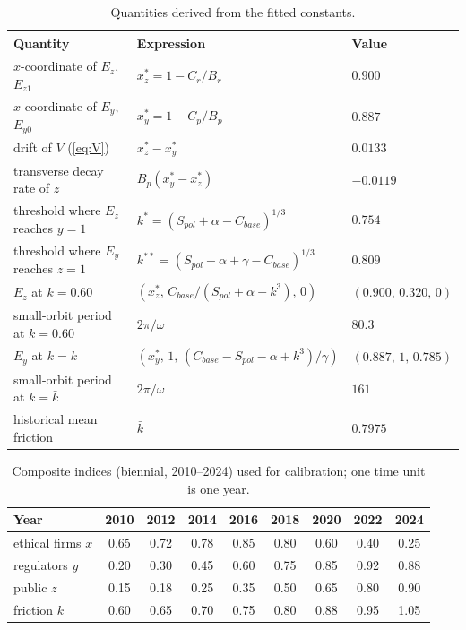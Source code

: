 \documentclass[10pt]{article}
\newcommand{\kbar}{\bar{k}}
\begin{document}
\begin{appendices}
\begin{table}
\centering
\caption{Quantities derived from the fitted constants.}\label{tab:derived}
{\small
\begin{tabular}{@{}lll@{}}
\toprule
Quantity & Expression & Value \\
\midrule
$x$-coordinate of $E_z$, $E_{z1}$ & $x_z^*=1-C_r/B_r$ & $0.900$ \\
$x$-coordinate of $E_y$, $E_{y0}$ & $x_y^*=1-C_p/B_p$ & $0.887$ \\
drift of $V$ (\cref{eq:V}) & $x_z^*-x_y^*$ & $0.0133$ \\
transverse decay rate of $z$ & $B_p(x_y^*-x_z^*)$ & $-0.0119$ \\
threshold where $E_z$ reaches $y=1$ & $k^*=(S_{pol}+\alpha-C_{base})^{1/3}$ & $0.754$ \\
threshold where $E_y$ reaches $z=1$ & $k^{**}=(S_{pol}+\alpha+\gamma-C_{base})^{1/3}$ & $0.809$ \\
$E_z$ at $k=0.60$ & $(x_z^*,\,C_{base}/(S_{pol}+\alpha-k^3),\,0)$ & $(0.900,\,0.320,\,0)$ \\
small-orbit period at $k=0.60$ & $2\pi/\omega$ & $80.3$ \\
$E_y$ at $k=\kbar$ & $(x_y^*,\,1,\,(C_{base}-S_{pol}-\alpha+k^3)/\gamma)$ & $(0.887,\,1,\,0.785)$ \\
small-orbit period at $k=\kbar$ & $2\pi/\omega$ & $161$ \\
historical mean friction & $\kbar$ & $0.7975$ \\
\bottomrule
\end{tabular}}
\end{table}

\begin{table}
\centering
\caption{Composite indices (biennial, 2010--2024) used for calibration; one time unit is one year.}\label{tab:indices}
{\small
\begin{tabular}{@{}lcccccccc@{}}
\toprule
Year & 2010 & 2012 & 2014 & 2016 & 2018 & 2020 & 2022 & 2024 \\
\midrule
ethical firms $x$ & 0.65 & 0.72 & 0.78 & 0.85 & 0.80 & 0.60 & 0.40 & 0.25 \\
regulators $y$ & 0.20 & 0.30 & 0.45 & 0.60 & 0.75 & 0.85 & 0.92 & 0.88 \\
public $z$ & 0.15 & 0.18 & 0.25 & 0.35 & 0.50 & 0.65 & 0.80 & 0.90 \\
friction $k$ & 0.60 & 0.65 & 0.70 & 0.75 & 0.80 & 0.88 & 0.95 & 1.05 \\
\bottomrule
\end{tabular}}
\end{table}


\end{appendices}
\end{document}
